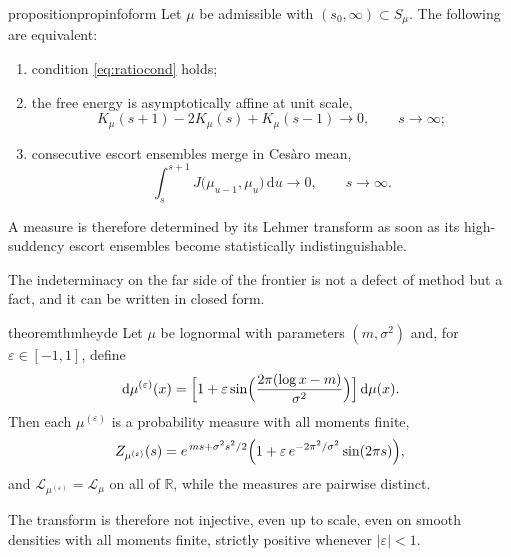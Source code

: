 \documentclass[sn-mathphys-num]{sn-jnl}
\theoremstyle{thmstyleone}%
\theoremstyle{thmstyletwo}%
\theoremstyle{thmstylethree}%
\theoremstyle{thmstyleone}%
\providecommand{\R}{\mathbb{R}}
\providecommand{\Leh}{\mathscr{L}}
\providecommand{\dd}{\,\mathrm{d}}
\begin{document}
	\begin{restatable}{proposition}{propinfoform}\label{prop:infoform}
		Let $\mu$ be admissible with $(s_0,\infty)\subset S_\mu$. The
		following are equivalent:
		\begin{enumerate}[label=\textup{(\roman*)},leftmargin=2.2em]
			\item condition \eqref{eq:ratiocond} holds;
			\item the free energy is asymptotically affine at unit scale,
			\begin{equation}\label{eq:seconddiff}
				K_\mu(s+1)-2K_\mu(s)+K_\mu(s-1)\longrightarrow0,
				\qquad s\to\infty;
			\end{equation}
			\item consecutive escort ensembles merge in Ces\`aro mean,
			\begin{equation}\label{eq:jeffreysmerge}
				\int_{s}^{s+1}J\bigl(\mu_{u-1},\mu_u\bigr)\dd u
				\longrightarrow0,\qquad s\to\infty .
			\end{equation}
		\end{enumerate}
		A measure is therefore determined by its Lehmer transform as soon
		as its high-suddency escort ensembles become statistically
		indistinguishable.
	\end{restatable}
	
	
	The indeterminacy on the far side of the frontier is not a defect of
	method but a fact, and it can be written in closed form.
	
	\begin{restatable}{theorem}{thmheyde}\label{thm:heyde}
		Let $\mu$ be lognormal with parameters $(m,\sigma^2)$ and, for
		$\varepsilon\in[-1,1]$, define
		\begin{equation}\label{eq:heydedef}
			\dd\mu^{(\varepsilon)}(x)
			=\Bigl[1+\varepsilon\sin\Bigl(
			\frac{2\pi(\log x-m)}{\sigma^{2}}\Bigr)\Bigr]\dd\mu(x).
		\end{equation}
		Then each $\mu^{(\varepsilon)}$ is a probability measure with all
		moments finite,
		\begin{equation}\label{eq:heydeZ}
			Z_{\mu^{(\varepsilon)}}(s)
			=e^{\,ms+\sigma^2s^2/2}
			\Bigl(1+\varepsilon\,e^{-2\pi^{2}/\sigma^{2}}\sin(2\pi s)\Bigr),
		\end{equation}
		and $\Leh_{\mu^{(\varepsilon)}}=\Leh_\mu$ on all of $\R$,
		while the measures are pairwise distinct.
	\end{restatable}
	
	The transform is therefore not injective, even up to scale, even on
	smooth densities with all moments finite, strictly positive
	whenever $|\varepsilon|<1$.
	
\end{document}
